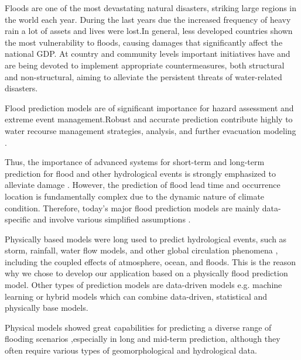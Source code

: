 \documentclass[12pt, a4paper]{report}
\begin{document}
Floods are one of the most devastating natural disasters, striking large regions in the world each year. During the last years due the increased frequency of heavy rain a lot of assets and lives were lost.In general, less developed countries shown the most vulnerability to floods, causing damages that significantly affect the national GDP. At country and community levels important initiatives have and are being devoted to implement appropriate countermeasures, both structural and non-structural, aiming to alleviate the persistent threats of water-related disasters. \cite{Flood-forecasting} 
\par

Flood prediction models are of significant importance for hazard assessment and extreme event management.Robust and accurate prediction contribute highly to water recourse management strategies, analysis, and further evacuation modeling \cite{Xie}.
\par

Thus, the importance of advanced systems for short-term and long-term prediction for flood and other hydrological events is strongly emphasized to alleviate damage \cite{Pitt}. However, the prediction of flood lead time and occurrence location is fundamentally complex due to the dynamic nature of climate condition. Therefore, today’s major flood prediction models are mainly data-specific and involve various simplified assumptions \cite{Lohani}. 
\par

Physically based models were long used to predict hydrological events, such as storm, rainfall, water flow models, and other global circulation phenomena , including the coupled effects of atmosphere, ocean, and floods. This is the reason why we chose to develop our application based on a physically flood prediction model. Other types of prediction models are data-driven models e.g. machine learning or hybrid models which can combine data-driven, statistical and physically base models.
\par 

Physical models showed great capabilities for predicting a diverse range of flooding scenarios \cite{Nayak},especially in long and mid-term prediction, although they often require various types of geomorphological and  hydrological data. 
\par 
\end{document}
